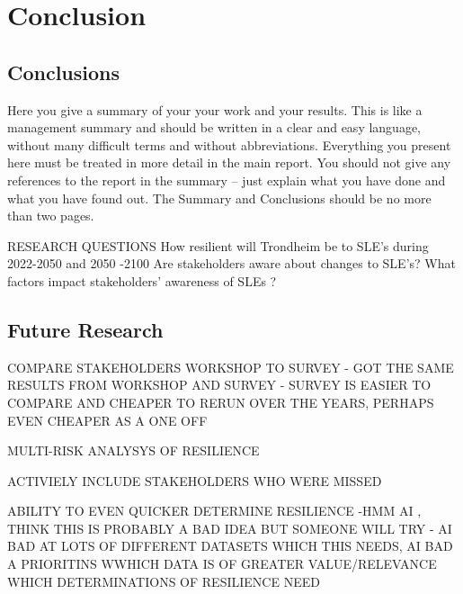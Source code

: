 
\chapter{Conclusion}
\section{Conclusions}
Here you give a summary of your your work and your results. This is like a management summary and should be written in a clear and easy language, without many difficult terms and without abbreviations. Everything you present here must be treated in more detail in the main report. You should not give any references to the report in the summary -- just explain what you have done and what you have found out. The Summary and Conclusions should be no more than two pages.

RESEARCH QUESTIONS
How resilient will Trondheim be to SLE’s during 2022-2050 and 2050 -2100
Are stakeholders aware about changes to SLE’s?
What factors impact stakeholders’ awareness of SLEs ?

\section{Future Research}
COMPARE STAKEHOLDERS WORKSHOP TO SURVEY 
\cite{gerkensmeier_governing_2018} - GOT THE SAME RESULTS FROM WORKSHOP AND SURVEY - SURVEY IS EASIER TO COMPARE AND CHEAPER TO RERUN OVER THE YEARS, PERHAPS EVEN CHEAPER AS A ONE OFF

MULTI-RISK ANALYSYS OF RESILIENCE

ACTIVIELY INCLUDE STAKEHOLDERS WHO WERE MISSED 

ABILITY TO EVEN QUICKER DETERMINE RESILIENCE -HMM AI , THINK THIS IS PROBABLY A BAD IDEA BUT SOMEONE WILL TRY - AI BAD AT LOTS OF DIFFERENT DATASETS WHICH THIS NEEDS, AI BAD A PRIORITINS WWHICH DATA IS OF GREATER VALUE/RELEVANCE WHICH DETERMINATIONS OF RESILIENCE NEED
